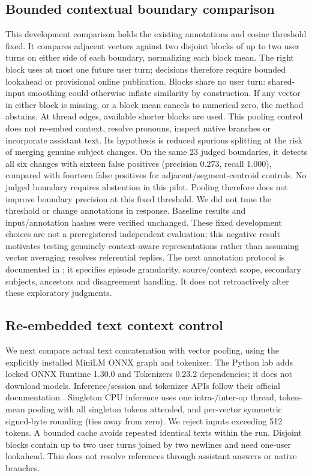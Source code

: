 \documentclass[11pt]{article}
\begin{document}
\subsection{Bounded contextual boundary comparison}
This development comparison holds the existing annotations and cosine
threshold fixed. It compares adjacent vectors against two disjoint blocks of up
to two user turns on either side of each boundary, normalizing each block mean.
The right block uses at most one future user turn; decisions therefore require
bounded lookahead or provisional online publication. Blocks share no user turn:
shared-input smoothing could otherwise inflate similarity by construction.
If any vector in either block is missing, or a block mean cancels to numerical
zero, the method abstains. At thread edges,
available shorter blocks are used. This pooling control does not re-embed context,
resolve pronouns, inspect native branches or incorporate assistant text.
Its hypothesis is reduced spurious splitting at the risk of merging genuine
subject changes. On the same 23 judged boundaries, it detects all six changes
with sixteen false positives (precision 0.273, recall 1.000), compared with
fourteen false positives for adjacent/segment-centroid controls. No judged
boundary requires abstention in this pilot. Pooling therefore does not improve
boundary precision at this fixed threshold. We did not tune the threshold or
change annotations in response. Baseline results and input/annotation hashes
were verified unchanged. These fixed development choices are not a preregistered
independent evaluation; this negative result motivates testing genuinely
context-aware representations rather than assuming vector averaging resolves
referential replies.
The next annotation protocol is documented in
; it specifies episode granularity,
source/context scope, secondary subjects, ancestors and disagreement handling.
It does not retroactively alter these exploratory judgments.

\subsection{Re-embedded text context control}
We next compare actual text concatenation with vector pooling, using the
explicitly installed MiniLM ONNX graph and tokenizer. The Python lab adds locked
ONNX Runtime 1.30.0 and Tokenizers 0.23.2 dependencies; it does not download
models. Inference/session and tokenizer APIs follow their official documentation
\cite{onnxruntime,tokenizers}. Singleton CPU inference uses one intra-/inter-op thread, token-mean
pooling with all singleton tokens attended, and per-vector symmetric signed-byte
rounding (ties away from zero). We reject inputs exceeding 512 tokens. A bounded
cache avoids repeated identical texts within the run. Disjoint blocks contain
up to two user turns joined by two newlines and need one-user lookahead. This
does not resolve references through assistant answers or native branches.
\end{document}
